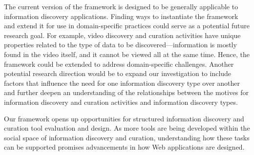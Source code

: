 \documentclass{sigchi}
\begin{document}
The current version of the framework is designed to be generally applicable to information discovery applications. Finding ways to instantiate the framework and extend it for use in domain-specific practices could serve as a potential future research goal. For example, video discovery and curation activities have unique properties related to the type of data to be discovered---information is mostly found in the video itself, and it cannot be viewed all at the same time. Hence, the framework could be extended to address domain-specific challenges. 
%
Another potential research direction would be to expand our investigation to include factors that influence the need for one information discovery type over another and further deepen an understanding of the relationships between the motives for information discovery and curation activities and information discovery types. 

Our framework opens up opportunities for structured information discovery and curation tool evaluation and design. As more tools are being developed within the social space of information discovery and curation, understanding how these tasks can be supported promises advancements in how Web applications are designed.


%
%
%
%
%
\balance{}
\newpage 



\end{document}

